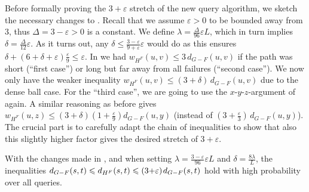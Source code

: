 \documentclass{article}\usepackage[a4paper,margin=20mm]{geometry}
\newcommand*{\nwspace}{\hspace*{.1em}}
\renewcommand{\le}{\leqslant}
\newcommand{\eps}{\varepsilon}
\begin{document}
Before formally proving the $3+\varepsilon$ stretch of the new query algorithm,
we sketch the necessary changes to .
Recall that we assume $\varepsilon >0$ to be bounded away from $3$,
thus $\Delta = 3-\varepsilon > 0$ is a constant.
We define $\lambda =\frac{\Delta}{96} \varepsilon L$,
which in turn implies $\delta = \frac{\Delta}{12} \varepsilon$.
As it turns out, any $\delta \le \frac{3-\varepsilon}{9+\varepsilon} \varepsilon$ would do
as this ensures 
$\delta +  (6 + \delta + \varepsilon) \frac{\varepsilon}{9} \le \varepsilon$.
In  we had $w_{H^F}(u,v) \le 3\, d_{G-F}(u,v)$
if the path was short (``first case'') or long but far away from all failures (``second case'').
We now only have the weaker inequality $w_{H^F}(u,v) \le (3{+}\delta)\, d_{G-F}(u,v)$ due to the dense ball case.
For the ``third case'', we are going to use the $x$-$y$-$z$-argument of  again. 
A similar reasoning as before gives
$w_{H^F}(u,z) \le (3{+}\delta)(1{+}\frac{\varepsilon}{9}) d_{G-F}(u,y)$
(instead of $(3{+}\frac{\varepsilon}{3}) \, d_{G-F}(u,y)$).
The crucial part is to carefully adapt the chain of inequalities to show that also this slightly higher factor gives the desired stretch of $3+\varepsilon$.

\begin{lemma}
\label{lem:improved_query_correctness}
  With the changes made in , 
  and when setting $\lambda = \frac{3-\varepsilon}{96} \varepsilon L$ 
  and $\delta = \frac{8\lambda}{L}$,
  the inequalities
  $d_{G-F}(s,t) \le d_{H^F}(s,t) \le (3{+}\eps) \nwspace d_{G-F}(s,t)$
  hold with high probability over all queries.
\end{lemma}
\end{document}
